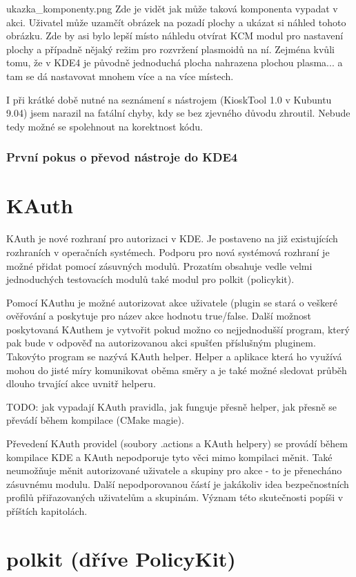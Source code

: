 ukazka_komponenty.png
Zde je vidět jak může taková komponenta vypadat v akci. Uživatel může uzamčít
obrázek na pozadí plochy a ukázat si náhled tohoto obrázku. Zde by asi bylo
lepší místo náhledu otvírat KCM modul pro nastavení plochy a případně nějaký
režim pro rozvržení plasmoidů na ní. Zejména kvůli tomu, že v KDE4 je původně
jednoduchá plocha nahrazena plochou plasma... a tam se dá nastavovat mnohem více
a na více místech.

I při krátké době nutné na seznámení s nástrojem (KioskTool 1.0 v Kubuntu 9.04)
jsem narazil na fatální chyby, kdy se bez zjevného důvodu zhroutil. Nebude tedy
možné se spolehnout na korektnost kódu.
\subsubsection{První pokus o převod nástroje do KDE4}

\section{KAuth}
KAuth je nové rozhraní pro autorizaci v KDE. Je postaveno na již existujících 
rozhraních v operačních systémech. Podporu pro nová systémová rozhraní je možné
přidat pomocí zásuvných modulů. Prozatím obsahuje vedle velmi jednoduchých
testovacích modulů také modul pro polkit (policykit).

Pomocí KAuthu je možné autorizovat akce uživatele (plugin se stará o veškeré
ověřování a poskytuje pro název akce hodnotu true/false. Další možnost
poskytovaná KAuthem je vytvořit pokud možno co nejjednodušší program, který
pak bude v odpověď na autorizovanou akci spušťen příslušným pluginem.
Takovýto program se nazývá KAuth helper. Helper a aplikace která ho využívá
mohou do jisté míry komunikovat oběma směry a je také možné sledovat průběh
dlouho trvající akce uvnitř helperu.

TODO: jak vypadají KAuth pravidla, jak funguje přesně helper, jak přesně
se převádí během kompilace (CMake magie).

Převedení KAuth providel (soubory .actions a KAuth helpery) se provádí během
kompilace KDE a KAuth nepodporuje tyto věci mimo kompilaci měnit. Také
neumožňuje měnit autorizované uživatele a skupiny pro akce - to je přenecháno
zásuvnému modulu. Další nepodporovanou částí je jakákoliv idea bezpečnostních
profilů přiřazovaných uživatelům a skupinám. Význam této skutečnosti popíši
v příštích kapitolách.

\section{polkit (dříve PolicyKit)}

